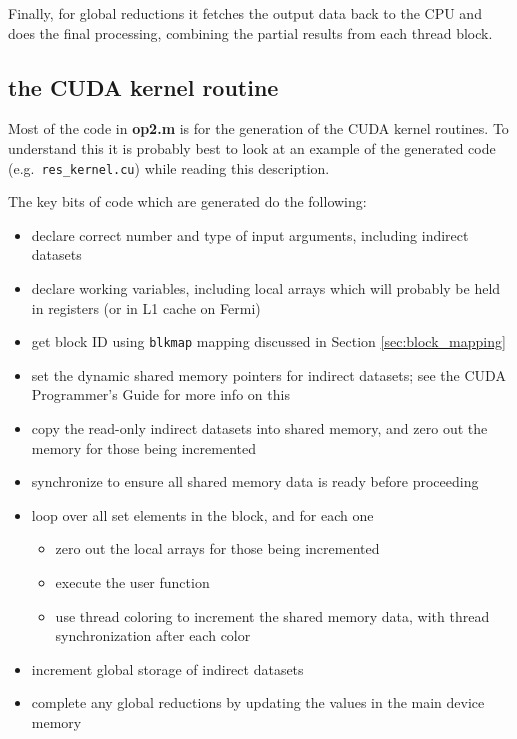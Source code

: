 \documentclass[12pt]{article}
\begin{document}
Finally, for global reductions it fetches the output data back
to the CPU and does the final processing, combining the partial
results from each thread block.


\subsection{the CUDA kernel routine}

Most of the code in {\bf op2.m} is for the generation of the CUDA 
kernel routines.  To understand this it is probably best to look
at an example of the generated code (e.g.~{\tt res\_kernel.cu})
while reading this description.

The key bits of code which are generated do the following:
\begin{itemize}
\item
declare correct number and type of input arguments, including
indirect datasets

\item
declare working variables, including local arrays which will probably
be held in registers (or in L1 cache on Fermi)

\item
get block ID using {\tt blkmap} mapping discussed in Section 
\ref{sec:block_mapping}

\item
set the dynamic shared memory pointers for indirect datasets; see 
the CUDA Programmer's Guide for more info on this

\item
copy the read-only indirect datasets into shared memory, 
and zero out the memory for those being incremented

\item
synchronize to ensure all shared memory data is ready before proceeding

\item
loop over all set elements in the block, and for each one
 \begin{itemize}
 \item zero out the local arrays for those being incremented
 \item execute the user function
 \item use thread coloring to increment the shared memory data,
       with thread synchronization after each color
 \end{itemize}

\item
increment global storage of indirect datasets 

\item
complete any global reductions by updating the values in the main device 
memory

\end{itemize}
\end{document}
